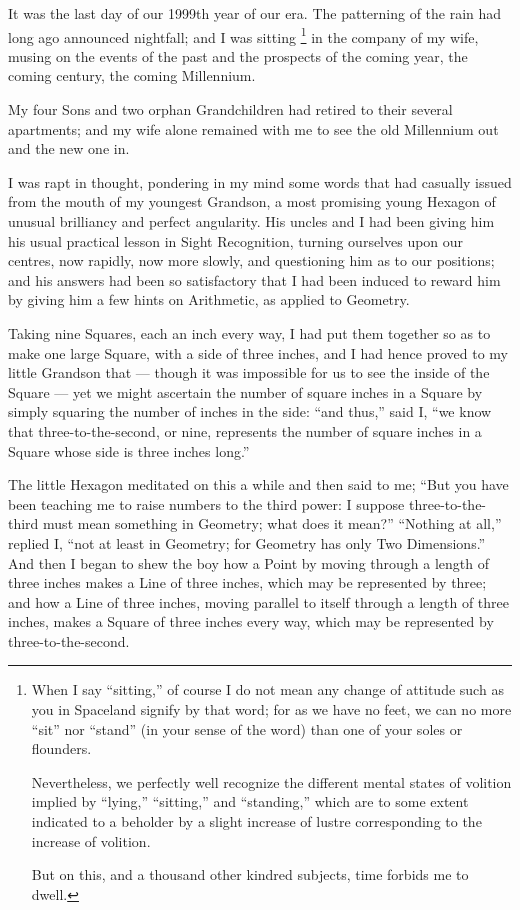 \documentclass[12pt, a4paper, twoside]{memoir}
\begin{document}
It was the last day of our 1999th year of our era. The patterning of the rain
had long ago announced nightfall; and I was sitting \footnote{ When I say
``sitting,'' of course I do not mean any change of attitude such as you in
Spaceland signify by that word; for as we have no feet, we can no more ``sit''
nor ``stand'' (in your sense of the word) than one of your soles or flounders.

Nevertheless, we perfectly well recognize the different mental states of
volition implied by ``lying,'' ``sitting,'' and ``standing,'' which are to some
extent indicated to a beholder by a slight increase of lustre corresponding to
the increase of volition.

But on this, and a thousand other kindred subjects, time forbids me to dwell.}
in the company of my wife, musing on the events of the past and the prospects
of the coming year, the coming century, the coming Millennium.

My four Sons and two orphan Grandchildren had retired to their several
apartments; and my wife alone remained with me to see the old Millennium out
and the new one in.

I was rapt in thought, pondering in my mind some words that had casually
issued from the mouth of my youngest Grandson, a most promising young Hexagon
of unusual brilliancy and perfect angularity. His uncles and I had been giving
him his usual practical lesson in Sight Recognition, turning ourselves upon
our centres, now rapidly, now more slowly, and questioning him as to our
positions; and his answers had been so satisfactory that I had been induced to
reward him by giving him a few hints on Arithmetic, as applied to Geometry.

Taking nine Squares, each an inch every way, I had put them together so as to
make one large Square, with a side of three inches, and I had hence proved to
my little Grandson that --- though it was impossible for us to see the inside of
the Square --- yet we might ascertain the number of square inches in a Square by
simply squaring the number of inches in the side: ``and thus,'' said I, ``we know
that three-to-the-second, or nine, represents the number of square inches in a
Square whose side is three inches long.''

The little Hexagon meditated on this a while and then said to me; ``But you
have been teaching me to raise numbers to the third power: I suppose
three-to-the-third must mean something in Geometry; what does it mean?''
``Nothing at all,'' replied I, ``not at least in Geometry; for Geometry has only
Two Dimensions.'' And then I began to shew the boy how a Point by moving
through a length of three inches makes a Line of three inches, which may be
represented by three; and how a Line of three inches, moving parallel to
itself through a length of three inches, makes a Square of three inches every
way, which may be represented by three-to-the-second.
\end{document}
